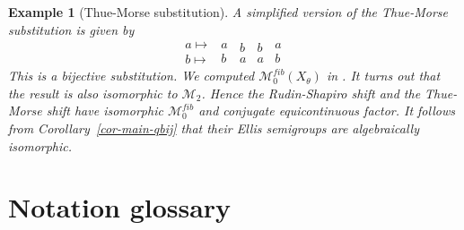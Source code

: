 \documentclass[10pt,a4paper]{amsart}
\newtheorem{example}[theorem]{Example}
\numberwithin{equation}{section}
\newcommand{\M}{\mathcal M}
\newcommand{\Sfib}{\M^{fib}_0(X_\theta)}
\begin{document}
\begin{example}[Thue-Morse substitution] \label{ex:TM} A simplified version of the  Thue-Morse substitution is given by
\[
\begin{array}{c} a \mapsto\\ b\mapsto\end{array} 
\begin{array}{c} a\,\\ b \end{array}
\!\!\!\!\!\!{\begin{array}{c} b\,\\ a \end{array}}
\!\!\!\!\!\!{\begin{array}{c} b\,\\ a \end{array}}
\!\!\!\!\!\!{\begin{array}{c} a\,\\ b \end{array}}
\]
This is a bijective substitution. We computed $\Sfib$ in \cite{ESBS}. It turns out that the result is also isomorphic to $\mathcal M_2$. Hence the Rudin-Shapiro shift and the Thue-Morse shift have isomorphic $\M_0^{fib}$ and conjugate equicontinuous factor. It follows from Corollary~\ref{cor-main-qbij} that their Ellis semigroups are algebraically isomorphic. 
\end{example}
\newpage
\section{Notation glossary}\label{sec:notation glossary}
\end{document}
